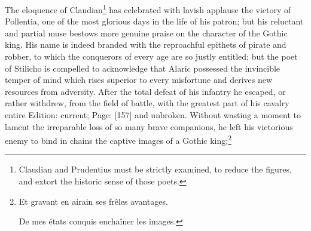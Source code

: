 The eloquence of Claudian\footnote{Claudian and Prudentius must be strictly examined, to reduce the figures, and extort the historic sense of those poets.} has celebrated with lavish applause the victory of Pollentia, one of the most glorious days in the life of his patron; but his reluctant and partial muse bestows more genuine praise on the character of the Gothic king. His name is indeed branded with the reproachful epithets of pirate and robber, to which the conquerors of every age are so justly entitled; but the poet of Stilicho is compelled to acknowledge that Alaric possessed the invincible temper of mind which rises superior to every misfortune and derives new resources from adversity. After the total defeat of his infantry he escaped, or rather withdrew, from the field of battle, with the greatest part of his cavalry entire Edition: current; Page: [157] and unbroken. Without wasting a moment to lament the irreparable loss of so many brave companions, he left his victorious enemy to bind in chains the captive images of a Gothic king;\footnote{Et gravant en airain ses frêles avantages.

De mes états conquis enchaîner les images.

}
